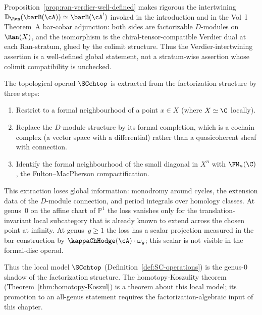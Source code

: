 \begin{remark}
\label{rem:ran-verdier-thmA}
Proposition~\ref{prop:ran-verdier-well-defined} makes rigorous the
intertwining $\bD_{\Ran}(\barB(\cA)) \simeq \barB(\cA^!)$ invoked in the
introduction and in the Vol~I Theorem~A bar-cobar adjunction: both
sides are factorizable $D$-modules on $\Ran(X)$, and the isomorphism is
the chiral-tensor-compatible Verdier dual at each Ran-stratum, glued by
the colimit structure. Thus the Verdier-intertwining assertion is a
well-defined global statement, not a stratum-wise assertion whose
colimit compatibility is unchecked.
\end{remark}

\begin{remark}
\label{rem:local-shadow-extraction}
The topological operad $\SCchtop$ is extracted from the factorization
structure by three steps:
\begin{enumerate}[label=\textup{(\arabic*)}]
\item Restrict to a formal neighbourhood of a point $x \in X$
 (where $X \simeq \C$ locally).
\item Replace the $D$-module structure by its formal completion, which
 is a cochain complex (a vector space with a differential) rather
 than a quasicoherent sheaf with connection.
\item Identify the formal neighbourhood of the small diagonal in
 $X^n$ with $\FM_n(\C)$, the Fulton--MacPherson compactification.
\end{enumerate}
This extraction loses global information: monodromy around cycles,
the extension data of the $D$-module connection, and period integrals
over homology classes. At genus~$0$ on the affine chart of
$\mathbb{P}^1$ the loss vanishes only for the translation-invariant
local subcategory that is already known to extend across the chosen
point at infinity. At genus~$g \geq 1$ the loss has a scalar
projection measured in the bar construction by
$\kappaChHodge(\cA)\cdot\omega_g$; this scalar is not visible in the
formal-disc operad.

Thus the local model $\SCchtop$
(Definition~\ref{def:SC-operations}) is the genus-$0$ shadow of
the factorization structure. The homotopy-Koszulity theorem
(Theorem~\ref{thm:homotopy-Koszul}) is a theorem about this local
model; its promotion to an all-genus statement requires the
factorization-algebraic input of this chapter.
\end{remark}


